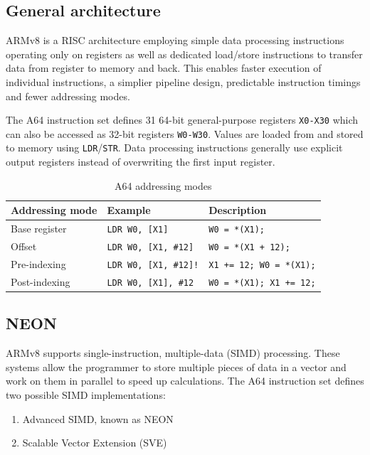 \subsection{General architecture}

ARMv8 is a RISC architecture employing simple data processing instructions
operating only on registers as well as dedicated load/store instructions to
transfer data from register to memory and back. This enables faster execution
of individual instructions, a simplier pipeline design, predictable instruction
timings and fewer addressing modes.

The A64 instruction set defines 31 64-bit general-purpose registers
\texttt{X0-X30} which can also be accessed as 32-bit registers \texttt{W0-W30}.
Values are loaded from and stored to memory using \texttt{LDR}/\texttt{STR}.
Data processing instructions generally use explicit output registers instead of
overwriting the first input register.

\begin{table}[h!]
    \centering
    \small
    \caption{A64 addressing modes}
    \begin{tabularx}{\textwidth}{llX}
        \toprule
        Addressing mode & Example & Description \\
        \midrule
        Base register & \texttt{LDR W0, [X1]} & \texttt{W0 = *(X1);} \\
        Offset & \texttt{LDR W0, [X1, \#12]} & \texttt{W0 = *(X1 + 12);} \\
        Pre-indexing & \texttt{LDR W0, [X1, \#12]!} & \texttt{X1 += 12; W0 = *(X1);} \\
        Post-indexing & \texttt{LDR W0, [X1], \#12} & \texttt{W0 = *(X1); X1 += 12;} \\
        \bottomrule
    \end{tabularx}
\end{table}

\subsection{NEON}
\label{ss:neon}

ARMv8 supports single-instruction, multiple-data (SIMD) processing. These systems
allow the programmer to store multiple pieces of data in a vector and work on
them in parallel to speed up calculations. The A64 instruction set defines two
possible SIMD implementations:

\begin{enumerate}
    \item Advanced SIMD, known as NEON
    \item Scalable Vector Extension (SVE)
\end{enumerate}

